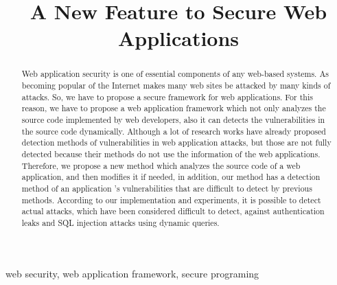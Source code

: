 \documentclass[conference]{IEEEtran}
\begin{document}
\title{A New Feature to Secure Web Applications}

\author{
\and
{}
\and
{}
}

\maketitle

\begin{abstract}
Web application security is one of essential components of any web-based systems.
As becoming popular of the Internet makes many web sites be attacked by many kinds of  attacks.
So, we have to propose a secure framework for web applications.
For this reason, we have to propose a web application framework which not only analyzes the source code implemented by web developers, also it can detects the vulnerabilities in the source code dynamically.
Although a lot of research works have already proposed detection methods of vulnerabilities in web application attacks, but those are not fully detected because their methods do not use the information of the web applications.
Therefore, we propose a new method which analyzes the source code of a web application, and then modifies it if needed, in addition, our method has a detection method of an application ’s vulnerabilities that are difficult to detect by previous methods.
According to our implementation and experiments, it is possible to detect actual attacks, which have been considered difficult to detect, against authentication leaks and SQL injection attacks using dynamic queries.
\end{abstract}

\begin{IEEEkeywords}
web security, web application framework, secure programing
\end{IEEEkeywords}
\end{document}
